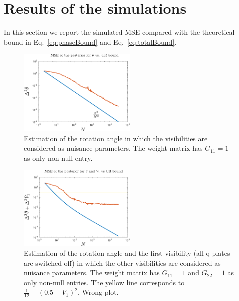 \documentclass[aps, pra, 10pt, twocolumn, superscriptaddress,floatfix]{revtex4-1}
\begin{document}
\section{Results of the simulations}
\label{sec:results}
%
In this section we report the simulated MSE compared with the theoretical bound in Eq.~\eqref{eq:phaseBound} and Eq.~\eqref{eq:totalBound}. 
%
\begin{figure}[!th]
	\begin{center}
		\includegraphics[width=0.5\textwidth]{theta.pdf}
	\end{center}
	\caption{Estimation of the rotation angle in which the visibilities are considered as nuisance parameters. The weight matrix has $G_{11} = 1$ as only non-null entry.}
	\label{fig:theta}
\end{figure}
%
\begin{figure}[!t]
	\begin{center}
		\includegraphics[width=0.5\textwidth]{thetaV1.pdf}
	\end{center}
	\caption{Estimation of the rotation angle and the first visibility (all q-plates are switched off) in which the other visibilities are considered as nuisance parameters. The weight matrix has $G_{11} = 1$ and $G_{22} = 1$ as only non-null entries. The yellow line corresponds to $\frac{1}{12} + (0.5 - V_1)^2$. {\color{red} Wrong plot.}}
	\label{fig:thetaV1}
\end{figure}
%
\end{document}
